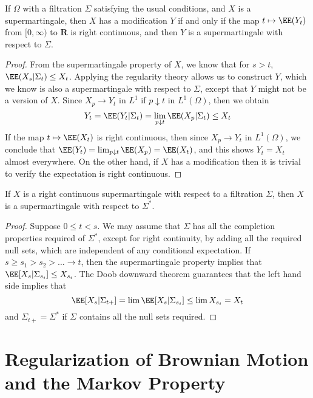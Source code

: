 \begin{theorem}
    If $\Omega$ with a filtration $\Sigma$ satisfying the usual conditions, and $X$ is a supermartingale, then $X$ has a \cadlag modification $Y$ if and only if the map $t \mapsto \EE(Y_t)$ from $[0,\infty)$ to $\mathbf{R}$ is right continuous, and then $Y$ is a \cadlag supermartingale with respect to $\Sigma$.
\end{theorem}
\begin{proof}
    From the supermartingale property of $X$, we know that for $s > t$, $\EE(X_s|\Sigma_t) \leq X_t$. Applying the regularity theory allows us to construct $Y$, which we know is also a supermartingale with respect to $\Sigma$, except that $Y$ might not be a version of $X$. Since $X_p \to Y_t$ in $L^1$ if $p \downarrow t$ in $L^1(\Omega)$, then we obtain
    \[ Y_t = \EE(Y_t|\Sigma_t) = \lim_{p \downarrow t} \EE(X_p|\Sigma_t) \leq X_t \]
    If the map $t \mapsto \EE(X_t)$ is right continuous, then since $X_p \to Y_t$ in $L^1(\Omega)$, we conclude that $\EE(Y_t) = \lim_{p \downarrow t} \EE(X_p) = \EE(X_t)$, and this shows $Y_t = X_t$ almost everywhere. On the other hand, if $X$ has a \cadlag modification then it is trivial to verify the expectation is right continuous.
\end{proof}

\begin{lemma}
    If $X$ is a right continuous supermartingale with respect to a filtration $\Sigma$, then $X$ is a supermartingale with respect to $\Sigma^*$.
\end{lemma}
\begin{proof}
    Suppose $0 \leq t < s$. We may assume that $\Sigma$ has all the completion properties required of $\Sigma^*$, except for right continuity, by adding all the required null sets, which are independent of any conditional expectation. If $s \geq s_1 > s_2 > \dots \to t$, then the supermartingale property implies that $\EE[X_s|\Sigma_{s_i}] \leq X_{s_i}$. The Doob downward theorem guarantees that the left hand side implies that
    \[ \EE[X_s|\Sigma_{t+}] = \lim \EE[X_s|\Sigma_{s_i}] \leq \lim X_{s_i} = X_t \]
    and $\Sigma_{t+} = \Sigma^*$ if $\Sigma$ contains all the null sets required.
\end{proof}

\section{Regularization of Brownian Motion and the Markov Property}

